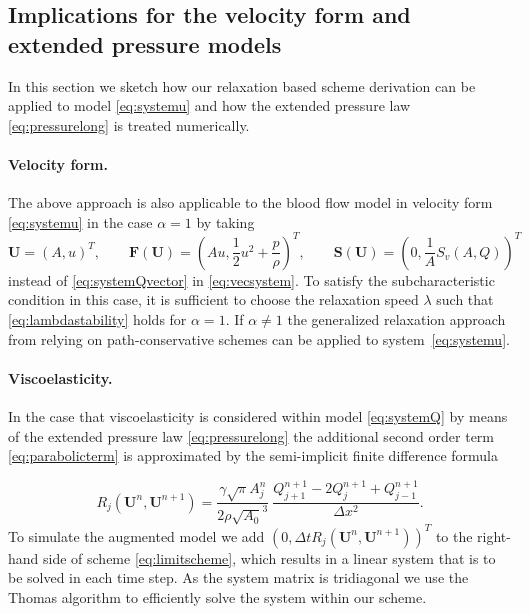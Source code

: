 \documentclass[a4paper,11pt]{article}
\begin{document}
\subsection{Implications for the velocity form and extended pressure models}
In this section we sketch how our relaxation based scheme derivation can be applied to model \eqref{eq:systemu} and how the extended pressure law \eqref{eq:pressurelong} is treated numerically. 
\paragraph{Velocity form.} The above approach is also applicable to the blood flow model in velocity form \eqref{eq:systemu} in the case $\alpha=1$ by taking
\begin{equation}\label{eq:systemuvector}
  \mathbf U = (A, u)^T, \qquad \mathbf F(\mathbf U) = \left(Au, \frac 1 2 u^2 + \frac{p}{\rho}\right)^T, \qquad \mathbf S(\mathbf U) = \left(0, \frac{1}{A}S_v(A, Q)\right)^T
\end{equation}
instead of \eqref{eq:systemQvector} in \eqref{eq:vecsystem}. To satisfy the subcharacteristic condition in this case, it is sufficient to choose the relaxation speed $\lambda$ such that \eqref{eq:lambdastability} holds for $\alpha=1$. If $\alpha \ne 1$ the generalized relaxation approach from \cite{kolbe2024numerschemcoupl} relying on path-conservative schemes can be applied to system~\eqref{eq:systemu}.

\paragraph{Viscoelasticity.} In the case that viscoelasticity is considered within model \eqref{eq:systemQ} by means of the extended pressure law \eqref{eq:pressurelong} the additional second order term \eqref{eq:parabolicterm} is approximated by the semi-implicit finite difference formula  

\begin{equation}
  R_j(\mathbf U^n, \mathbf U^{n+1}) = \frac{\gamma \sqrt{\pi} A_j^n}{2 \rho \sqrt{A_0}^3} ~ \frac{Q_{j+1}^{n+1} - 2 Q_j^{n+1} + Q_{j-1}^{n+1}}{\Delta x^2}.
\end{equation}
To simulate the augmented model we add $(0, \Delta t  R_j(\mathbf U^n, \mathbf U^{n+1}))^T$  to the right-hand side of scheme \eqref{eq:limitscheme}, which results in a linear system that is to be solved in each time step. As the system matrix is tridiagonal we use the Thomas algorithm to efficiently solve the system within our scheme.
\end{document}
